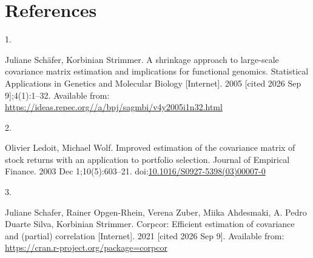 \documentclass[
  10pt,
  letterpaper,
  DIV=11,
  numbers=noendperiod]{scrartcl}
\newlength{\cslhangindent}
\newlength{\csllabelwidth}
\newenvironment{CSLReferences}[2] %
 {\begin{list}{}{%
  \setlength{\itemindent}{0pt}
  \setlength{\leftmargin}{0pt}
  \setlength{\parsep}{0pt}
  \ifodd #1
   \setlength{\leftmargin}{\cslhangindent}
   \setlength{\itemindent}{-1\cslhangindent}
  \fi
  \setlength{\itemsep}{#2\baselineskip}}}
 {\end{list}}
\newcommand{\CSLLeftMargin}[1]{\parbox[t]{\csllabelwidth}{\strut#1\strut}}
\newcommand{\CSLRightInline}[1]{\parbox[t]{\linewidth - \csllabelwidth}{\strut#1\strut}}
\begin{document}
\begin{table}

\caption{\label{tbl-rd_vs_ps}The correlations between family-wise
summary statistics of mean and standard deviation for each region and in
naturalistic or noisy families. The correlations of family-wise means
tends to be high for both types of texture families. Correlations in
within-family SD tend to drop in noisy families.}


\end{table}%

\section{References}\label{references}

\label{refs}
\begin{CSLReferences}{0}{1}
\CSLLeftMargin{1. }%
\CSLRightInline{Juliane Schäfer, Korbinian Strimmer. A shrinkage
approach to large-scale covariance matrix estimation and implications
for functional genomics. Statistical Applications in Genetics and
Molecular Biology {[}Internet{]}. 2005 {[}cited 2026 Sep
9{]};4(1):1--32. Available from:
\url{https://ideas.repec.org//a/bpj/sagmbi/v4y2005i1n32.html}}

\CSLLeftMargin{2. }%
\CSLRightInline{Olivier Ledoit, Michael Wolf. Improved estimation of the
covariance matrix of stock returns with an application to portfolio
selection. Journal of Empirical Finance. 2003 Dec 1;10(5):603--21.
doi:\href{https://doi.org/10.1016/S0927-5398(03)00007-0}{10.1016/S0927-5398(03)00007-0}}

\CSLLeftMargin{3. }%
\CSLRightInline{Juliane Schafer, Rainer Opgen-Rhein, Verena Zuber, Miika
Ahdesmaki, A. Pedro Duarte Silva, Korbinian Strimmer. Corpcor: Efficient
estimation of covariance and (partial) correlation {[}Internet{]}. 2021
{[}cited 2026 Sep 9{]}. Available from:
\url{https://cran.r-project.org/package=corpcor}}

\end{CSLReferences}
\end{document}
